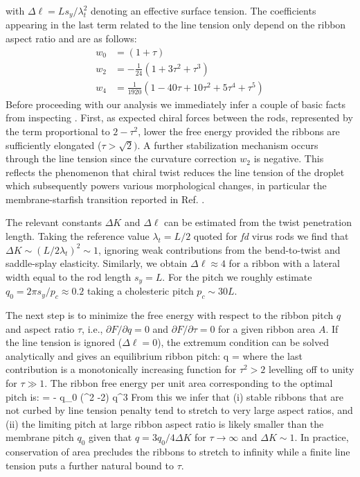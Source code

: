 with $\Delta \ell = Ls_{y} / \lambda_{t}^{2} $ denoting an effective surface tension. 
The coefficients appearing in the last term related to the line tension only depend on the ribbon aspect ratio and are as follows:
\begin{align}
w_{0} &= (1 + \tau)  \nonumber \\ 
w_{2} &= -\frac{1}{24}  (1 + 3 \tau^{2} + \tau^{3} ) \nonumber \\
w_{4} &=  \frac{1}{1920} (1 - 40 \tau + 10 \tau^{2} + 5 \tau^{4} + \tau^{5})
\end{align}
Before proceeding with our analysis we immediately infer a couple of basic facts from inspecting . First, as expected chiral forces between the rods, represented by the term proportional to $2-\tau^{2}$, lower the free energy provided the ribbons are sufficiently elongated ($\tau  >\sqrt{2})$. A further stabilization mechanism occurs through the line tension since the curvature correction $w_{2}$ is negative. This reflects the phenomenon that chiral twist reduces the line tension of the droplet which subsequently powers various morphological changes, in particular the membrane-starfish transition reported in Ref. \cite{Gibaud2014}. 

The relevant constants $\Delta K$ and $\Delta \ell$ can be estimated from the twist penetration length. Taking the reference value $\lambda_{t} = L/2$ quoted for {\em fd} virus rods we find that  $\Delta K \sim (L/2\lambda_{t})^{2} \sim 1 $,  ignoring weak contributions from the bend-to-twist and saddle-splay elasticity. Similarly, we obtain $\Delta \ell \approx 4 $ for a ribbon with a lateral width equal to the rod length $s_{y} = L$. For the pitch we roughly estimate $q_{0} = 2 \pi s_{y} / p_{c} \approx 0.2$ taking a cholesteric pitch  $p_{c} \sim 30L$. 

The next step is to minimize the free energy  with respect to the ribbon pitch $q$ and aspect ratio $\tau$, i.e., $\partial F/\partial q =0$ and $\partial F/\partial \tau =0$ for a given ribbon area $A$. If the line tension is ignored ($\Delta \ell =0$), the extremum condition can be solved analytically and gives an equilibrium ribbon pitch:
\beq
q =   
\eeq
where the last contribution is a monotonically increasing function for $\tau^{2} >2$ levelling off to unity for $\tau \gg 1$. The ribbon free energy per unit area corresponding to the optimal pitch is:
\beq
{}  = - q_{0}  (\tau^{2} -2) q^{3}
\eeq
From this we infer that (i) stable ribbons that are not curbed by line tension penalty tend to stretch to very large aspect ratios, and (ii) the limiting pitch at large ribbon aspect ratio is likely smaller than the membrane pitch $q_{0}$ given that $q =  3q_{0}/4 \Delta K$ for $\tau \rightarrow \infty $ and $\Delta K \sim 1$. In practice, conservation of area precludes the ribbons to stretch to infinity while a finite line tension puts a further natural bound to $\tau$. 



